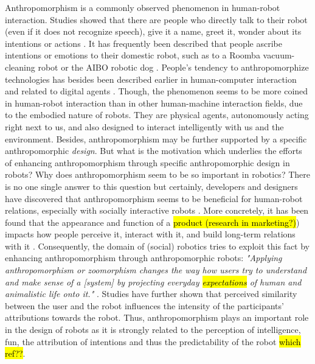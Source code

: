 \documentclass[lettersize, apacite, twoside, HRI]{apa_HRI}
\begin{document}
Anthropomorphism is a commonly observed phenomenon in human-robot interaction. Studies showed that there are people who directly talk to their robot (even if it does not recognize speech), give it a name, greet it, wonder about its intentions or actions \cite{eyssel_anthropomorphic_2010,fink_anthropomorphic_2012,forlizzi_how_2007,fussell_how_2008,kiesler_anthropomorphic_2008}. It has frequently been described that people ascribe intentions or emotions to their domestic robot, such as to a Roomba vacuum-cleaning robot \cite{krumm_my_2007,sung_robots_2009} or the AIBO robotic dog \cite{friedman_hardware_2003}. People's tendency to anthropomorphize technologies has besides been described earlier in human-computer interaction and related to digital agents \cite{reeves_media_1996, nass_anthropocentrism_1995}. Though, the phenomenon seems to be more coined in human-robot interaction than in other human-machine interaction fields, due to the embodied nature of robots. They are physical agents, autonomously acting right next to us, and also designed to interact intelligently with us and the environment. Besides, anthropomorphism may be further supported by a specific anthropomorphic \emph{design}. But what is the motivation which underlies the efforts of enhancing anthropomorphism through specific anthropomorphic design in robots? Why does anthropomorphism seem to be so important in robotics? There is no one single answer to this question but certainly, developers and designers have discovered that anthropomorphism seems to be beneficial for human-robot relations, especially with socially interactive robots \cite{fong_survey_2003}. More concretely, it has been found that the appearance and function of a \hl{product (research in marketing?)}) impacts how people perceive it, interact with it, and build long-term relations with it \cite{bartneck_shaping_2004}. Consequently, the domain of (social) robotics tries to exploit this fact by enhancing anthropomorphism through anthropomorphic robots: \textit{"Applying anthropomorphism or zoomorphism changes the way how users try to understand and make sense of a [system] by projecting everyday \hl{expectations} of human and animalistic life onto it."} \cite{schmitz_concepts_2011}. Studies have further shown that perceived similarity between the user and the robot influences the intensity of the participants' attributions towards the robot. Thus, anthropomorphism plays an important role in the design of robots as it is strongly related to the perception of intelligence, fun, the attribution of intentions and thus the predictability of the robot \hl{which ref??}.
\end{document}
